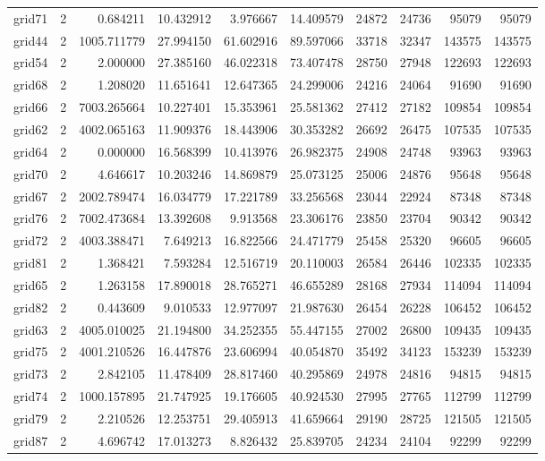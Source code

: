 \begin{longtable}{|l|r|r|r|r|r|r|r|r|r|}
grid71 & 2 & 0.684211 & 10.432912 & 3.976667 & 14.409579 & 24872 & 24736 & 95079 & 95079 \\
grid44 & 2 & 1005.711779 & 27.994150 & 61.602916 & 89.597066 & 33718 & 32347 & 143575 & 143575 \\
grid54 & 2 & 2.000000 & 27.385160 & 46.022318 & 73.407478 & 28750 & 27948 & 122693 & 122693 \\
grid68 & 2 & 1.208020 & 11.651641 & 12.647365 & 24.299006 & 24216 & 24064 & 91690 & 91690 \\
grid66 & 2 & 7003.265664 & 10.227401 & 15.353961 & 25.581362 & 27412 & 27182 & 109854 & 109854 \\
grid62 & 2 & 4002.065163 & 11.909376 & 18.443906 & 30.353282 & 26692 & 26475 & 107535 & 107535 \\
grid64 & 2 & 0.000000 & 16.568399 & 10.413976 & 26.982375 & 24908 & 24748 & 93963 & 93963 \\
grid70 & 2 & 4.646617 & 10.203246 & 14.869879 & 25.073125 & 25006 & 24876 & 95648 & 95648 \\
grid67 & 2 & 2002.789474 & 16.034779 & 17.221789 & 33.256568 & 23044 & 22924 & 87348 & 87348 \\
grid76 & 2 & 7002.473684 & 13.392608 & 9.913568 & 23.306176 & 23850 & 23704 & 90342 & 90342 \\
grid72 & 2 & 4003.388471 & 7.649213 & 16.822566 & 24.471779 & 25458 & 25320 & 96605 & 96605 \\
grid81 & 2 & 1.368421 & 7.593284 & 12.516719 & 20.110003 & 26584 & 26446 & 102335 & 102335 \\
grid65 & 2 & 1.263158 & 17.890018 & 28.765271 & 46.655289 & 28168 & 27934 & 114094 & 114094 \\
grid82 & 2 & 0.443609 & 9.010533 & 12.977097 & 21.987630 & 26454 & 26228 & 106452 & 106452 \\
grid63 & 2 & 4005.010025 & 21.194800 & 34.252355 & 55.447155 & 27002 & 26800 & 109435 & 109435 \\
grid75 & 2 & 4001.210526 & 16.447876 & 23.606994 & 40.054870 & 35492 & 34123 & 153239 & 153239 \\
grid73 & 2 & 2.842105 & 11.478409 & 28.817460 & 40.295869 & 24978 & 24816 & 94815 & 94815 \\
grid74 & 2 & 1000.157895 & 21.747925 & 19.176605 & 40.924530 & 27995 & 27765 & 112799 & 112799 \\
grid79 & 2 & 2.210526 & 12.253751 & 29.405913 & 41.659664 & 29190 & 28725 & 121505 & 121505 \\
grid87 & 2 & 4.696742 & 17.013273 & 8.826432 & 25.839705 & 24234 & 24104 & 92299 & 92299 \\

\end{longtable}
